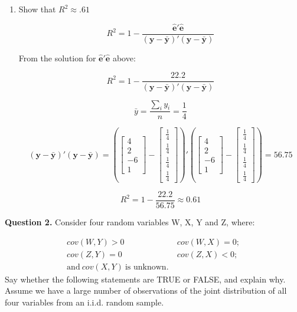 \documentclass[12pt]{article}
\begin{document}
\begin{enumerate}
  
  
  \item Show that $R^2\approx .61$



\[
R^2 = 1 - \frac{\mathbf{\hat{e}'\hat{e}}}{\mathbf{(y - \bar{y})'(y-\bar{y})}}
\]

From the solution for $\mathbf{\hat{e}'\hat{e}}$ above:

\[
R^2 = 1 - \frac{22.2}{\mathbf{(y - \bar{y})'(y-\bar{y})}}
\]

\[
\bar{y} = \frac{\sum_i y_i}{n} = \frac{1}{4}
\]

\[
\mathbf{(y - \bar{y})'(y-\bar{y})} = (\left[\begin{array}{c}4\\2\\-6\\1\end{array}\right] - \left[\begin{array}{c}\frac{1}{4}
\\\frac{1}{4} \\\frac{1}{4} \\\frac{1}{4} \end{array}\right])' (\left[\begin{array}{c}4\\2\\-6\\1\end{array}\right] - \left[\begin{array}{c}\frac{1}{4}
\\\frac{1}{4} \\\frac{1}{4} \\\frac{1}{4} \end{array}\right]) = 56.75
\]

\[
R^2 = 1 - \frac{22.2}{56.75} \approx 0.61
\]

\end{enumerate}

\clearpage
\textbf{Question 2.} \hspace{3mm} Consider four random variables W, X, Y and Z, where:

\begin{align*}
cov(W,Y) > 0 ~&~ cov(W, X)=0;\\
cov(Z,Y) = 0 ~&~ cov(Z, X) <0;\\
\text{and}~cov(X,Y)~\text{is unknown}.
\end{align*}
Say whether the following statements are TRUE or FALSE, and explain why. Assume we
have a large number of observations of the joint distribution of all four variables from an
i.i.d. random sample.
\end{document}
